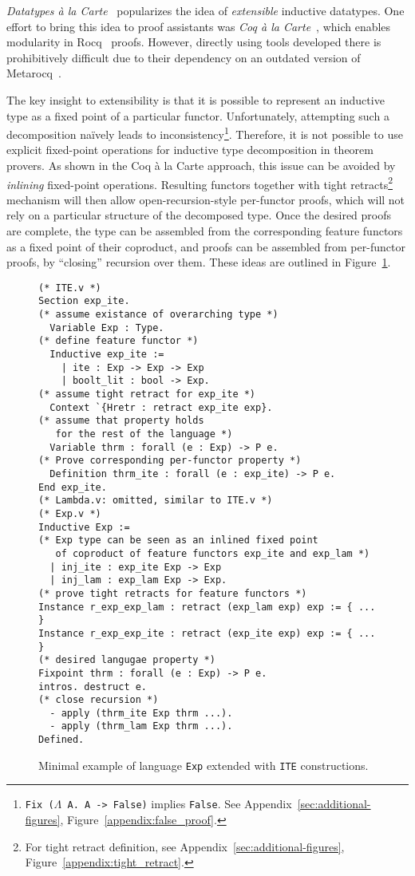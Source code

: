 \documentclass[sigplan,nonacm,review]{acmart}
\begin{document}
\emph{Datatypes à la Carte}~\cite{swierstra2008data}
popularizes the idea of
\emph{extensible} inductive datatypes. 
One effort to bring this idea to proof assistants
was \emph{Coq à la Carte}~\cite{forster2020coq},
which enables modularity in Rocq~\cite{the_coq_development_team_2024_14542673} proofs.
However,
directly using tools developed there
is prohibitively difficult
due to their dependency on an outdated version of Metarocq~\cite{sozeau2020metacoq}.

The key insight to extensibility is that it is possible to represent an inductive type as a fixed point of a particular functor. Unfortunately, attempting such a decomposition na\"ively leads to inconsistency\footnote{\texttt{Fix ($\Lambda$ A. A -> False)} implies \texttt{False}. See Appendix~\ref{sec:additional-figures}, Figure~\ref{appendix:false_proof}.}. 
Therefore, it is not possible to use explicit fixed-point operations for inductive type decomposition in theorem provers.
As shown in the Coq à la Carte approach,
this issue can be avoided by \emph{inlining} fixed-point operations.  
Resulting functors together with tight retracts\footnote{For tight retract definition, see Appendix~\ref{sec:additional-figures}, Figure~\ref{appendix:tight_retract}.} mechanism will then allow open-recursion-style per-functor proofs,
which will not rely on a particular structure of the decomposed type.
Once the desired proofs are complete,
the type can be assembled from the corresponding feature functors as a fixed point of their coproduct,
and proofs can be assembled from
per-functor proofs,
by ``closing'' recursion over them. These ideas are outlined in Figure~\ref{fig:alacart_example}.

\begin{figure}
\begin{lstlisting}[language=Coq]
(* ITE.v *)
Section exp_ite.
(* assume existance of overarching type *)
  Variable Exp : Type.
(* define feature functor *)
  Inductive exp_ite := 
    | ite : Exp -> Exp -> Exp
    | boolt_lit : bool -> Exp.
(* assume tight retract for exp_ite *)
  Context `{Hretr : retract exp_ite exp}.
(* assume that property holds 
   for the rest of the language *)
  Variable thrm : forall (e : Exp) -> P e.
(* Prove corresponding per-functor property *)
  Definition thrm_ite : forall (e : exp_ite) -> P e.
End exp_ite.
(* Lambda.v: omitted, similar to ITE.v *)
(* Exp.v *)
Inductive Exp := 
(* Exp type can be seen as an inlined fixed point 
   of coproduct of feature functors exp_ite and exp_lam *)
  | inj_ite : exp_ite Exp -> Exp
  | inj_lam : exp_lam Exp -> Exp.
(* prove tight retracts for feature functors *)
Instance r_exp_exp_lam : retract (exp_lam exp) exp := { ... }
Instance r_exp_exp_ite : retract (exp_ite exp) exp := { ... }
(* desired langugae property *)
Fixpoint thrm : forall (e : Exp) -> P e.
intros. destruct e.
(* close recursion *)
  - apply (thrm_ite Exp thrm ...).
  - apply (thrm_lam Exp thrm ...).
Defined.
\end{lstlisting}
  \caption{Minimal example of language \texttt{Exp} extended with \texttt{ITE} constructions. }
  \label{fig:alacart_example}
\end{figure}
\end{document}
